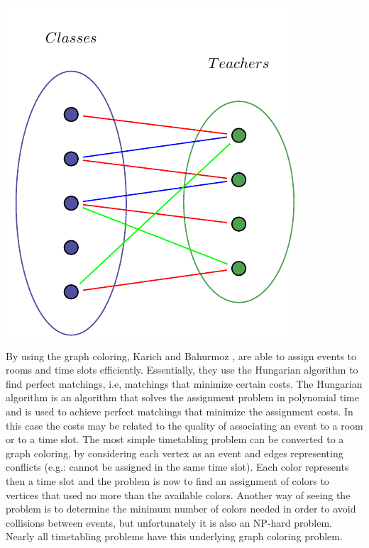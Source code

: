 	  \begin{minipage}{\linewidth}
            \centering
            \includegraphics[scale=0.7]{./Figures/tkiz/bipartite.pdf}
            \label{fig:bipartite}
        \end{minipage}
By using the graph coloring, Karich and Bahurmoz \citep{peter_karich},\citep{bahurmozhungarian} are able to assign events to rooms and time slots efficiently. Essentially, they use the Hungarian algorithm to find perfect matchings, i.e, matchings that minimize certain costs. The Hungarian algorithm is an algorithm that solves the assignment problem in polynomial time and is used to achieve perfect matchings that minimize the assignment costs. In this case the costs may be related to the quality of associating an event to a room or to a time slot.
    The most simple timetabling problem can be converted to a graph coloring, by considering each vertex as an event and edges representing conflicts (e.g.: cannot be assigned in the same time slot). Each color represents then a time slot and the problem is now to find an assignment of colors to vertices that used no more than the available colors. Another way of seeing the problem is to determine the minimum number of colors needed in order to avoid collisions between events, but unfortunately it is also an NP-hard problem. Nearly all timetabling problems have this underlying graph coloring problem.

